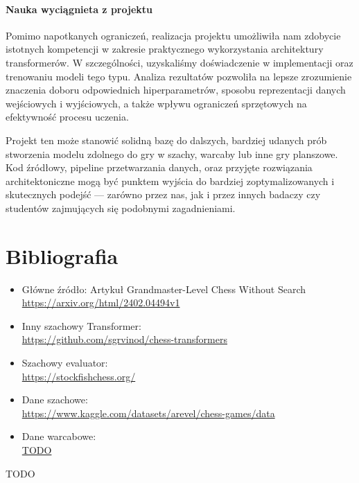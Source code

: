 \documentclass[12pt]{article}
\begin{document}
\paragraph{Nauka wyciągnieta z projektu} 
Pomimo napotkanych ograniczeń, realizacja projektu umożliwiła nam zdobycie istotnych kompetencji w zakresie praktycznego wykorzystania architektury transformerów. W szczególności, uzyskaliśmy doświadczenie w implementacji oraz trenowaniu modeli tego typu. Analiza rezultatów pozwoliła na lepsze zrozumienie znaczenia doboru odpowiednich hiperparametrów, sposobu reprezentacji danych wejściowych i wyjściowych, a także wpływu ograniczeń sprzętowych na efektywność procesu uczenia.

Projekt ten może stanowić solidną bazę do dalszych, bardziej udanych prób stworzenia modelu zdolnego do gry w szachy, warcaby lub inne gry planszowe. Kod źródłowy, pipeline przetwarzania danych, oraz przyjęte rozwiązania architektoniczne mogą być punktem wyjścia do bardziej zoptymalizowanych i skutecznych podejść — zarówno przez nas, jak i przez innych badaczy czy studentów zajmujących się podobnymi zagadnieniami.

\section{Bibliografia}
\begin{itemize}
    \item Główne źródło: Artykuł Grandmaster-Level Chess Without Search
       \\ \url{https://arxiv.org/html/2402.04494v1}
    \item Inny szachowy Transformer:
       \\ \url{https://github.com/sgrvinod/chess-transformers}
    \item Szachowy evaluator:
       \\ \url{https://stockfishchess.org/}
    \item Dane szachowe: 
       \\ \url{https://www.kaggle.com/datasets/arevel/chess-games/data}
    \item Dane warcabowe: 
       \\ \url{TODO}

\end{itemize}

TODO
\end{document}
